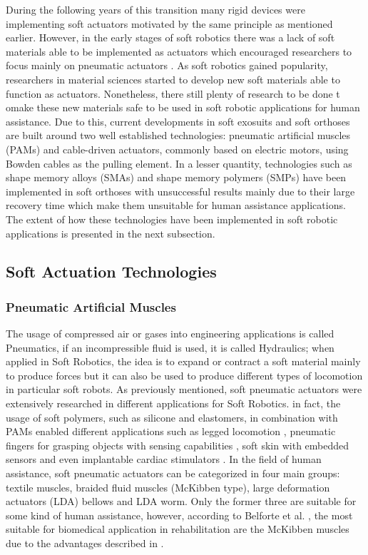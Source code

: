During the following years of this transition many rigid devices were implementing soft actuators motivated by the same principle as mentioned earlier. However, in the early stages of soft robotics there was a lack of soft materials able to be implemented as actuators which encouraged researchers to focus mainly on pneumatic actuators \cite{Belforte2014}. As soft robotics gained popularity, researchers in material sciences started to develop new soft materials able to function as actuators. Nonetheless, there still plenty of research to be done t omake these new materials safe to be used in soft robotic applications for human assistance. Due to this, current developments in soft exosuits and soft orthoses are built around two well established technologies: pneumatic artificial muscles (PAMs) and cable-driven actuators, commonly based on electric motors, using Bowden cables as the pulling element. In a lesser quantity, technologies such as shape memory alloys (SMAs) and shape memory polymers (SMPs) have been implemented in soft orthoses with unsuccessful results mainly due to their large recovery time which make them unsuitable for human assistance applications. The extent of how these technologies have been implemented in soft robotic applications is presented in the next subsection.

\subsection{Soft Actuation Technologies} \label{sec:SoftActuation}

\subsubsection{Pneumatic Artificial Muscles} \label{sec:PMAs}

The usage of compressed air or gases into engineering applications is called Pneumatics, if an incompressible fluid is used, it is called Hydraulics; when applied in Soft Robotics, the idea is to expand or contract a soft material mainly to produce forces but it can also be used to produce different types of locomotion in particular soft robots. As previously mentioned, soft pneumatic actuators were extensively researched in different applications for Soft Robotics. in fact, the usage of soft polymers, such as silicone and elastomers, in combination with PAMs enabled different applications such as legged locomotion \cite{Florez2014}, pneumatic fingers for grasping objects with sensing capabilities \cite{Morrow2015}, soft skin with embedded sensors \cite{Sonar2016,Suh2014} and even implantable cardiac stimulators \cite{Roche2014}. In the field of human assistance, soft pneumatic actuators can be categorized in four main groups: textile muscles, braided fluid muscles (McKibben type), large deformation actuators (LDA) bellows and LDA worm. Only the former three are suitable for some kind of human assistance, however, according to Belforte et al. \cite{Belforte2014}, the most suitable for biomedical application in rehabilitation are the McKibben muscles due to the advantages described in .

